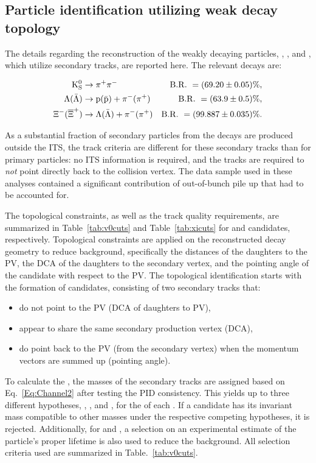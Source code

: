 \subsection{Particle identification utilizing weak decay topology}\label{Sec:Sec}

The details regarding the
reconstruction of the weakly decaying particles, \kzero, \LA, and \XI,
which utilize secondary tracks, are reported here. The relevant decays are:

\begin{align}
\label{Eq:Channel2}
\nonumber{\rm K}^{0}_{\rm{S}} &\rightarrow \rm \pi^+\pi^- & \rm B.R.~= (69.20\pm0.05)\%,\\ 
\nonumber\Lambda(\bar{\Lambda}) &\rightarrow \rm p(\bar{p}) + \pi^-(\pi^+ ) & \rm B.R.~= (63.9 \pm 0.5)\%,\\
\Xi^-(\overline{\Xi}^+) &\rightarrow \rm \Lambda(\bar{\Lambda})+\pi^-(\pi^+)  & \rm B.R.~= (99.887 \pm 0.035)\%.
\end{align}

As a substantial fraction of secondary particles from the decays are
produced outside the ITS, the track criteria are different for these
secondary tracks than for primary particles:  no ITS information is required, and the tracks are required to \emph{not} point directly back to the collision vertex. The data sample used in these analyses contained a significant contribution of out-of-bunch pile up that had to be accounted for.

The topological constraints, as well as the track quality
requirements, are summarized in Table~\ref{tab:v0cuts} and Table~\ref{tab:xicuts} for \VZ and \XI candidates, respectively. Topological constraints are applied on the reconstructed decay geometry to reduce background, specifically the distances of the daughters to the PV, the DCA of the daughters to the secondary vertex, and the pointing angle of the \VZ candidate with respect to the PV. The topological identification starts with the formation of \VZ candidates, consisting of two secondary tracks that:
\begin{itemize}
\item do not point to the PV (DCA of daughters to PV),
\item appear to share the same secondary production vertex (\VZ DCA),
\item do point back to the PV (from the secondary vertex) when
  the momentum vectors are summed up (pointing angle).
\end{itemize}
To calculate the \Minv, the masses of the secondary tracks are assigned based on Eq.~\ref{Eq:Channel2} after testing the PID consistency. This yields up to three different hypotheses, \kzero, \LA, and \AL, for the \Minv of each \VZ. If a \VZ candidate has its invariant mass compatible to other \VZ masses under the respective competing hypotheses, it is rejected. Additionally, for \LA and \AL, a selection on an experimental estimate of the particle's proper lifetime is also used to reduce the background. All selection criteria used are summarized in Table.~\ref{tab:v0cuts}.


